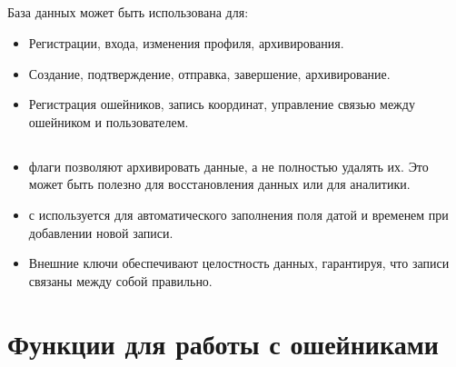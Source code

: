 \documentclass[letterpaper,10pt,russian]{sphinxmanual}
\begin{document}
\section{}
\label{\detokenize{src/database:id2}}
\sphinxAtStartPar
База данных может быть использована для:
\begin{itemize}
\item {} 
\sphinxAtStartPar
{}  Регистрации, входа, изменения профиля, архивирования.

\item {} 
\sphinxAtStartPar
{}  Создание, подтверждение, отправка, завершение, архивирование.

\item {} 
\sphinxAtStartPar
{}  Регистрация ошейников, запись координат, управление связью между ошейником и пользователем.

\end{itemize}


\section{}
\label{\detokenize{src/database:id3}}\begin{itemize}
\item {} 
\sphinxAtStartPar
{}\sphinxhyphen{}флаги позволяют архивировать данные, а не полностью удалять их. Это может быть полезно для восстановления данных или для аналитики.

\item {} 
\sphinxAtStartPar
{}  с   используется для автоматического заполнения поля датой и временем при добавлении новой записи.

\item {} 
\sphinxAtStartPar
Внешние ключи обеспечивают целостность данных, гарантируя, что записи связаны между собой правильно.

\end{itemize}

\sphinxstepscope


\chapter{Функции для работы с ошейниками}
\label{\detokenize{src/devices/devices:id1}}\label{\detokenize{src/devices/devices::doc}}
\sphinxAtStartPar
{}
\end{document}
